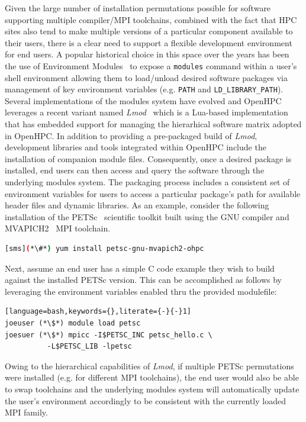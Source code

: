 \documentclass{sig-alternate-05-2015}
\begin{document}
\noindent
Given the large number of installation permutations possible for software
supporting multiple compiler/MPI toolchains, combined with the fact that HPC
sites also tend to make multiple versions of a particular component available
to their users, there is a clear need to support a flexible development environment for end
users. A popular historical choice in this space over the years has been the
use of Environment Modules~\cite{furlani_1996} to expose a \texttt{modules}
command within a user's shell environment allowing them to load/unload desired
software packages via management of key environment variables
(e.g. \texttt{{PATH}} and \texttt{{LD\_LIBRARY\_PATH}}). Several
implementations of the modules system have evolved and OpenHPC leverages a
recent variant named {\em Lmod}~\cite{tacc_sc_best_practices:2011,lmod_url}
which is a Lua-based implementation that has embedded support for managing the
hierarhical software matrix adopted in OpenHPC.  In addition to providing a
pre-packaged build of {\em Lmod}, development libraries and tools integrated
within OpenHPC include the installation of companion module files.
Consequently, once a desired package is installed, end users can then access
and query the software through the underlying modules system. The packaging
process includes a consistent set of environment variables for users to
access a particular package's path for available header files and dynamic
libraries. As an example, consider the following installation of the
PETSc~\cite{PETSc_url} scientific toolkit built using the GNU compiler and
MVAPICH2~\cite{MVAPICH_url} MPI toolchain.

\begin{lstlisting}[language=bash,keywords={}]
[sms](*\#*) yum install petsc-gnu-mvapich2-ohpc
\end{lstlisting}

\noindent
Next, assume an end user has a simple C code example they wish to build against
the installed PETSc version. This can be accomplished as follows by leveraging
the environment variables enabled thru the provided modulefile:

\begin{lstlisting}[language=bash,keywords={},literate={-}{-}1]
joeuser (*\$*) module load petsc
joesuer (*\$*) mpicc -I$PETSC_INC petsc_hello.c \
          -L$PETSC_LIB -lpetsc
\end{lstlisting}

Owing to the hierarchical capabilities of {\em Lmod}, if multiple PETSc
permutations were installed (e.g. for different MPI toolchains), the end user
would also be able to swap toolchains and the underlying modules system will
automatically update the user's environment accordingly to be consistent with
the currently loaded MPI family.
\end{document}
